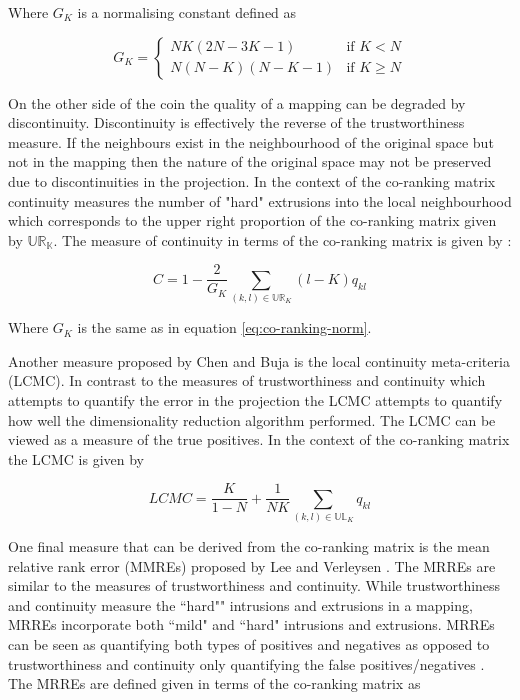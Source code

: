 Where $G_K$ is a normalising constant defined as

\begin{equation}
\label{eq:co-ranking-norm}
	G_K =
\left\{
	\begin{array}{ll}
		NK(2N - 3K - 1)  & \mbox{if } K < N \\
		N(N - K)(N - K - 1) & \mbox{if } K \geq N
	\end{array}
\right.
\end{equation}

On the other side of the coin the quality of a mapping can be degraded by discontinuity. Discontinuity is effectively the reverse of the trustworthiness measure. If the neighbours exist in the neighbourhood of the original space but not in the mapping then the nature of the original space may not be preserved due to discontinuities in the projection. In the context of the co-ranking matrix continuity measures the number of "hard" extrusions into the local neighbourhood which corresponds to the upper right proportion of the co-ranking matrix given by $\mathbb{UR_K}$. The measure of continuity in terms of the co-ranking matrix is given by \cite{lee2009quality}:

\begin{equation}
	C = 1 - \frac{2}{G_{K}} \sum\limits_{(k,l) \in \mathbb{UR}_K} (l - K)q_{kl}
\end{equation}

Where $G_K$ is the same as in equation \ref{eq:co-ranking-norm}.

Another measure proposed by Chen and Buja \cite{chen2009local} is the local continuity meta-criteria (LCMC). In contrast to the measures of trustworthiness and continuity which attempts to quantify the error in the projection the LCMC attempts to quantify how well the dimensionality reduction algorithm performed. The LCMC can be viewed as a measure of the true positives. In the context of the co-ranking matrix the LCMC is given by

\begin{equation}
	LCMC = \frac{K}{1 - N} + \frac{1}{NK} \sum\limits_{(k,l) \in \mathbb{UL}_K} q_{kl}
\end{equation}

One final measure that can be derived from the co-ranking matrix is the mean relative rank error (MMREs) proposed by Lee and Verleysen \cite{lee2007nonlinear}. The MRREs are similar to the measures of trustworthiness and continuity. While trustworthiness and continuity measure the ``hard"" intrusions and extrusions in a mapping, MRREs incorporate both ``mild" and ``hard" intrusions and extrusions. MRREs can be seen as quantifying both types of positives and negatives as opposed to trustworthiness and continuity only quantifying the false positives/negatives \cite{lee2009quality}. The MRREs are defined given in terms of the co-ranking matrix as

